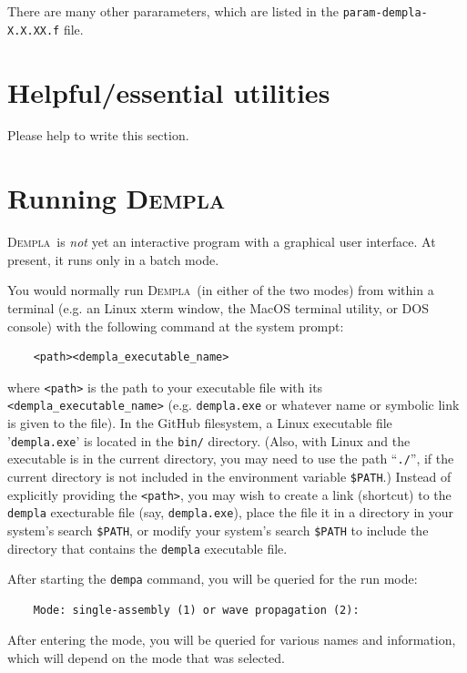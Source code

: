 \documentclass[letterpaper,11pt]{article}
\newcommand{\Dempla}{\textsc{Dempla}}
\begin{document}
%
There are many other pararameters, which are listed
in the \texttt{param-dempla-X.X.XX.f} file.
%
%
\section{Helpful/essential utilities}\label{sec:Utilities}
Please help to write this section.
%
%
%
%
\section{Running \Dempla} \label{sec:RunOval}
\Dempla\ is \emph{not} yet an interactive program with a graphical
user interface.
At present, it runs only in a batch mode.
%
\par
You would normally run \Dempla\ (in either of the two modes)
from within a terminal (e.g. an Linux xterm window, the
MacOS terminal utility,
or DOS console) with the following command at the system prompt:\\[-2ex]
\begin{verbatim}
    <path><dempla_executable_name>
\end{verbatim}
\rule{0ex}{3ex}where \texttt{<path>} is the path to your executable
file with its \texttt{<dempla\_executable\_name>}
(e.g. \texttt{dempla.exe} or whatever
name or symbolic link is given to the file).
In the GitHub filesystem,
a Linux executable file '\texttt{dempla.exe}'
is located in the \texttt{bin/} directory.
(Also, with Linux and the executable is in the current directory,
you may need to use the path ``\texttt{./}'',
if the current directory is not included in the environment
variable \texttt{\$PATH}.)
Instead of explicitly providing the \texttt{<path>}, you may wish to
create a link (shortcut) to the \texttt{dempla} execturable file
(say, \texttt{dempla.exe}),
place the file it in a directory in your system's search \texttt{\$PATH}, 
or modify your system's search \texttt{\$PATH} to include
the directory that contains the \texttt{dempla} executable file.
\par
After starting the \texttt{dempa} command, you
will be queried for the run mode:\\[-2ex]
%
\begin{verbatim}
    Mode: single-assembly (1) or wave propagation (2):
\end{verbatim}
%
\rule{0ex}{3ex}After entering the mode, you will be queried for various names
and information, which will
depend on the mode that was selected.
%
\end{document}
